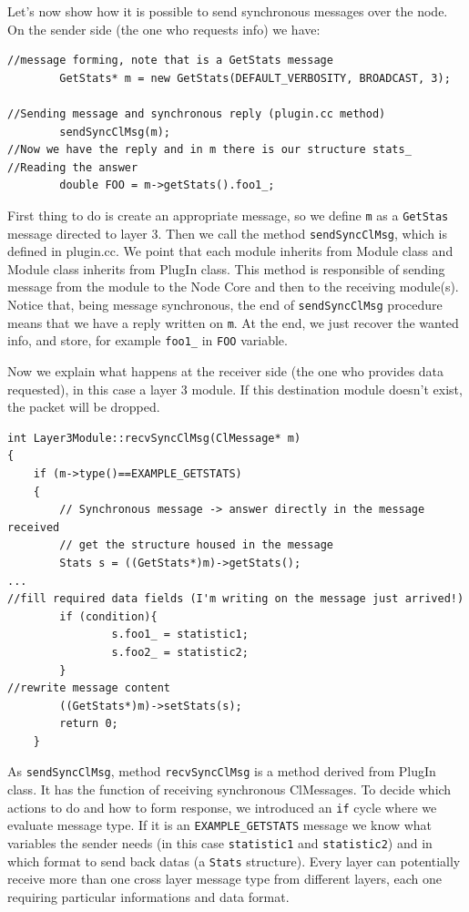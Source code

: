 \documentclass[a4paper,10pt]{article}
\begin{document}
Let's now show how it is possible to send synchronous messages over the node. On the sender side (the one who requests info) we have:
\begin{verbatim}
//message forming, note that is a GetStats message
		GetStats* m = new GetStats(DEFAULT_VERBOSITY, BROADCAST, 3);

//Sending message and synchronous reply (plugin.cc method)
		sendSyncClMsg(m);
//Now we have the reply and in m there is our structure stats_
//Reading the answer
		double FOO = m->getStats().foo1_;
\end{verbatim}

First thing to do is create an appropriate message, so we define \verb=m= as a \verb=GetStas= message directed to layer 3. Then we call the method \verb=sendSyncClMsg=, which is defined in plugin.cc. We point that each module inherits from Module class and Module class inherits from PlugIn class. This method is responsible of sending message from the module to the Node Core and then to the receiving module(s). Notice that, being message synchronous, the end of \verb=sendSyncClMsg= procedure means that we have a reply written on \verb=m=. At the end, we just recover the wanted info, and store, for example \verb=foo1_= in \verb=FOO= variable.

Now we explain what happens at the receiver side (the one who provides data requested), in this case a layer 3 module. If this destination module doesn't exist, the packet will be dropped.
\begin{verbatim}
int Layer3Module::recvSyncClMsg(ClMessage* m)
{
	if (m->type()==EXAMPLE_GETSTATS)
	{
		// Synchronous message -> answer directly in the message received
		// get the structure housed in the message
		Stats s = ((GetStats*)m)->getStats();
...
//fill required data fields (I'm writing on the message just arrived!)
		if (condition){
				s.foo1_ = statistic1;
				s.foo2_ = statistic2;
		}
//rewrite message content
		((GetStats*)m)->setStats(s);
		return 0;
	}
\end{verbatim}

As \verb=sendSyncClMsg=, method \verb=recvSyncClMsg= is a method derived from PlugIn class. It has the function of receiving synchronous ClMessages. To decide which actions to do and how to form response, we introduced an \verb=if= cycle where we evaluate message type. If it is an \verb=EXAMPLE_GETSTATS= message we know what variables the sender needs (in this case \verb=statistic1= and \verb=statistic2=) and in which format to send back datas (a \verb=Stats= structure). Every layer can potentially receive more than one cross layer message type from different layers, each one requiring particular informations and data format.
\end{document}
